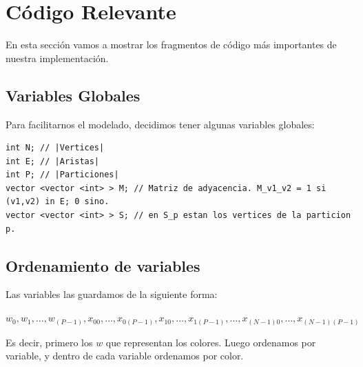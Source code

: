 \documentclass[a4paper, 10pt, twoside]{article}
\begin{document}






\newpage

\appendix

\section{Código Relevante}

En esta sección vamos a mostrar los fragmentos de código más importantes de nuestra implementación.

\subsection{Variables Globales}

Para facilitarnos el modelado, decidimos tener algunas variables globales:

\begin{lstlisting}
int N; // |Vertices|
int E; // |Aristas|
int P; // |Particiones|
vector <vector <int> > M; // Matriz de adyacencia. M_v1_v2 = 1 si (v1,v2) in E; 0 sino.
vector <vector <int> > S; // en S_p estan los vertices de la particion p.
\end{lstlisting}

\subsection{Ordenamiento de variables}

Las variables las guardamos de la siguiente forma:
\begin{center}
$w_0, w_1, \ldots, w_{(P-1)}, x_{00}, \ldots, x_{0(P-1)}, x_{10}, \ldots, x_{1(P-1)}, \ldots, x_{(N-1)0},\ldots, x_{(N-1)(P-1)}$
\end{center}

Es decir, primero los $w$ que representan los colores. Luego ordenamos por variable, y dentro de cada variable ordenamos por color.
\end{document}
